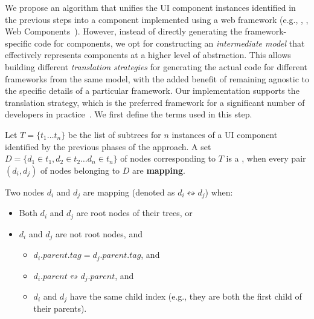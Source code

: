 We propose an algorithm that unifies the UI component instances 
identified in the previous steps
into a component
implemented using a web framework (e.g., \react, \angular, \html Web Components~\cite{MDN:2017:WebComponents}).
However, instead of directly generating the framework-specific code for components,
we opt for constructing an \textit{intermediate model}
that effectively represents components at a higher level of abstraction.
This allows building different \textit{translation strategies}
for generating the actual code 
for different frameworks from the same model,
with the added benefit of remaining agnostic 
to the specific details of a particular framework. 
Our implementation supports the \react~\cite{React} translation strategy,
 which is the preferred framework for a significant number of developers in practice~\cite{StateOfJS:WebPlatformTests, StackOverflow:2017:Survey}.
We first define the terms used in this step.

\begin{defn}[\textbf{\mappedset}]
	\label{definition:mapped-nodes-set}
	Let $T = \{t_1 \ldots t_n\}$ be the list of \dom subtrees for $n$ instances
	of a UI component identified by the previous phases of the approach.
    A set $D = \{d_1 \in t_1, d_2 \in t_2\ldots d_n \in t_n\}$ of \dom nodes corresponding to $T$
	is a \mappedset,
	when every pair $(d_i, d_j)$ of \dom nodes 
	belonging to $D$ are \textbf{mapping}.
\end{defn}

\begin{defn}
	Two \dom nodes $d_i$ and $d_j$
	are mapping (denoted as $d_i \leftrightsquigarrow d_j$) when:
	\begin{itemize}[leftmargin=*]
	\item Both $d_i$ and $d_j$ are root nodes of their trees, or 
	\item $d_i$ and $d_j$ are not root nodes, and
	\begin{itemize}[leftmargin=*]
		\item $d_i.parent.tag = d_j.parent.tag$, and
		\item $d_i.parent \leftrightsquigarrow d_j.parent$, and
		\item $d_i$ and $d_j$ have the same child index 
		(e.g., they are both the first child of their parents).
	\end{itemize}

	\end{itemize}
\end{defn}

